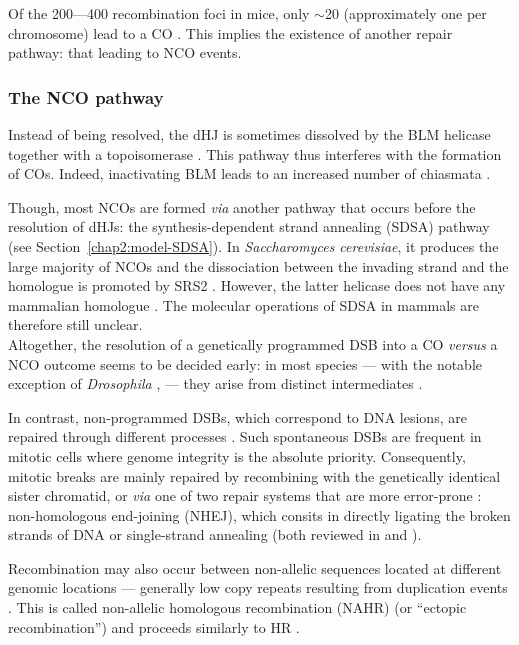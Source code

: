 Of the 200—400 recombination foci in mice, only $\sim$20 (approximately one per chromosome) lead to a CO \citep{baudat2007regulating}.
This implies the existence of another repair pathway: that leading to NCO events.


\subsubsection{The NCO pathway}
Instead of being resolved, the dHJ is sometimes dissolved by the BLM helicase together with a topoisomerase \citep{wu2003bloom}. 
This pathway thus interferes with the formation of COs. Indeed, inactivating BLM leads to an increased number of chiasmata \citep{holloway2010mammalian}.

Though, most NCOs are formed \textit{via} another pathway that occurs before the resolution of dHJs: the synthesis-dependent strand annealing (SDSA) pathway (see Section~\ref{chap2:model-SDSA}).
In \textit{Saccharomyces cerevisiae}, it produces the large majority of NCOs \citep{martini2011genomewide} and the dissociation between the invading strand and the homologue is promoted by SRS2 \citep{ira2003srs2}.
However, the latter helicase does not have any mammalian homologue \citep{spell2004examination}. The molecular operations of SDSA in mammals are therefore still unclear.\\


Altogether, the resolution of a genetically programmed DSB into a CO \textit{versus} a NCO outcome seems to be decided early: in most species — with the notable exception of \textit{Drosophila} \citep{crown2014eliminating}, — they arise from distinct intermediates \citep[reviewed in][]{hunter2015meiotic}.

In contrast, non-programmed DSBs, which correspond to DNA lesions, are repaired through different processes \citep[reviewed in][]{sung2006mechanism}.
Such spontaneous DSBs are frequent in mitotic cells where genome integrity is the absolute priority.
Consequently, mitotic breaks are mainly repaired by recombining with the genetically identical sister chromatid, or \textit{via} one of two repair systems that are more error-prone \citep{smith2001influence}: non-homologous end-joining (NHEJ), which consits in directly ligating the broken strands of DNA \citep{weterings2004mechanism} or single-strand annealing (both reviewed in \citealp{helleday2003pathways} and \citealp{moynahan2010mitotic}).

Recombination may also occur between non-allelic sequences located at different genomic locations — generally low copy repeats resulting from duplication events \citep{bailey2006primate}. 
This is called non-allelic homologous recombination (NAHR) (or “ectopic recombination”) and proceeds similarly to HR \citep{sasaki2010genome}.

